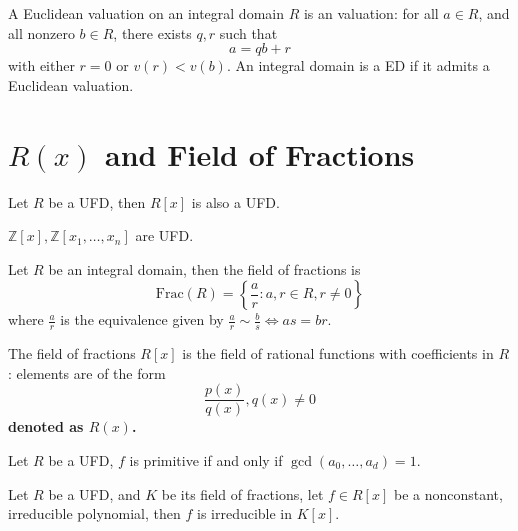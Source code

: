 \documentclass[openany]{book}
\newcommand{\Z}{\mathbb{Z}}
\begin{document}
\begin{defn}
    A Euclidean valuation on an integral domain $R$ is an valuation: for all $a\in R$, and all nonzero $b\in R$, there exists $q,r$ such that 
    \begin{equation*}
        a=qb+r
    \end{equation*}
    with either $r=0$ or $v(r)<v(b)$. An integral domain is a ED if it admits a Euclidean valuation.
\end{defn}

\section{$R(x)$ and Field of Fractions}

\begin{thm}
    Let $R$ be a UFD, then $R[x]$ is also a UFD.
\end{thm}
\begin{example}
    $\Z[x],\Z[x_1,\dots,x_n]$ are UFD.
\end{example}

\begin{defn}
    Let $R$ be an integral domain, then the field of fractions is 
    \begin{equation*}
        \text{Frac}(R)=\left\{\frac{a}{r}: a,r\in R, r\neq 0\right\}
    \end{equation*}
    where $\frac{a}{r}$ is the equivalence given by $\frac{a}{r}\sim \frac{b}{s}\iff as=br$.
\end{defn}


\begin{defn}
    The field of fractions $R[x]$ is the field of rational functions with coefficients in $R$: elements are of the form 
    \begin{equation*}
        \frac{p(x)}{q(x)}, q(x)\neq 0
    \end{equation*}
    \textbf{denoted as $R(x)$.}
\end{defn}




\begin{defn}[primitive]
    Let $R$ be a UFD, $f$ is primitive if and only if $\gcd(a_0,\dots, a_d)=1$.
\end{defn}



\begin{prop}
    Let $R$ be a UFD, and $K$ be its field of fractions, let $f\in R[x]$ be a nonconstant, irreducible polynomial, then $f$ is irreducible in $K[x]$.
\end{prop}
\end{document}
